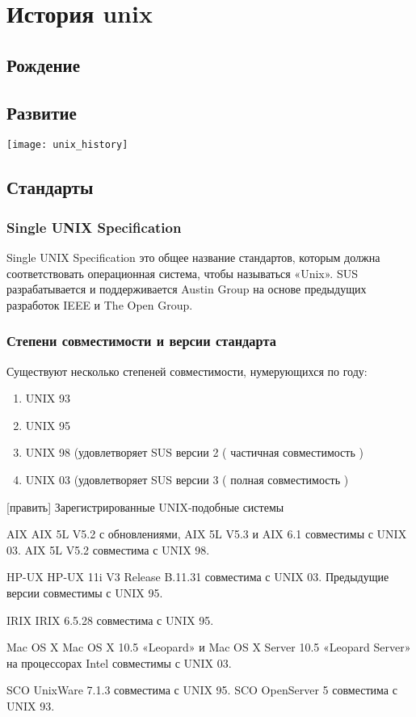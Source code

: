 \chapter {История unix}
\section {Рождение}
\section {Развитие}
\texttt{[image: unix\_history]}
\section {Стандарты}
\subsection {Single UNIX Specification}
Single UNIX Specification это общее название стандартов, которым должна соответствовать операционная система, чтобы называться «Unix». SUS разрабатывается и поддерживается Austin Group на основе предыдущих разработок IEEE и The Open Group.
\subsection {Степени совместимости и версии стандарта}
Существуют несколько степеней совместимости, нумерующихся по году:
\begin{enumerate}
\item UNIX 93
\item UNIX 95
\item UNIX 98 (удовлетворяет SUS версии 2 ( частичная совместимость )
\item UNIX 03 (удовлетворяет SUS версии 3 ( полная совместимость )
\end{enumerate}
[править] Зарегистрированные UNIX-подобные системы

AIX
    AIX 5L V5.2 с обновлениями, AIX 5L V5.3 и AIX 6.1 совместимы с UNIX 03. AIX 5L V5.2 совместима с UNIX 98.

HP-UX
    HP-UX 11i V3 Release B.11.31 совместима с UNIX 03. Предыдущие версии совместимы с UNIX 95.

IRIX
    IRIX 6.5.28 совместима с UNIX 95.

Mac OS X
    Mac OS X 10.5 «Leopard» и Mac OS X Server 10.5 «Leopard Server» на процессорах Intel совместимы с UNIX 03.

SCO
    UnixWare 7.1.3 совместима с UNIX 95. SCO OpenServer 5 совместима с UNIX 93.

